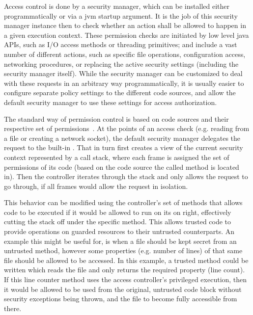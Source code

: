 	Access control is done by a security manager, which can be installed either programmatically or via a jvm startup argument. It is the job of this security manager instance then to check whether an action shall be allowed to happen in a given execution context. These permission checks are initiated by low level java APIs, such as I/O access methods or threading primitives; and include a vast number of different actions, such as specific file operations, configuration access, networking procedures, or replacing the active security settings (including the security manager itself). While the security manager can be customized to deal with these requests in an arbitrary way programmatically, it is usually easier to configure separate policy settings to the different code sources, and allow the default security manager to use these settings for access authorization.
	
	The standard way of permission control is based on code sources and their respective set of permissions~\cite{JavaAccessControl}. At the points of an access check (e.g. reading from a file or creating a network socket), the default security manager delegates the request to the built-in . That in turn first creates a view of the current security context represented by a call stack, where each frame is assigned the set of permissions of its code (based on the code source the called method is located in). Then the controller iterates through the stack and only allows the request to go through, if all frames would allow the request in isolation.
	
	This behavior can be modified using the controller's set of  methods that allows code to be executed if it would be allowed to run on its on right, effectively cutting the stack off under the specific method. This allows trusted code to provide operations on guarded resources to their untrusted counterparts. An example this might be useful for, is when a file should be kept secret from an untrusted method, however some properties (e.g. number of lines) of that same file should be allowed to be accessed. In this example, a trusted method could be written which reads the file and only returns the required property (line count). If this line counter method uses the access controller's privileged execution, then it would be allowed to be used from the original, untrusted code block without security exceptions being thrown, and the file to become fully accessible from there.

